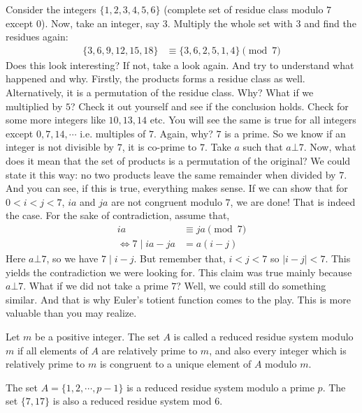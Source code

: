 Consider the integers $\{1,2,3,4,5,6\}$ (complete set of residue class modulo $7$ except $0$). Now, take an integer, say $3$. Multiply the whole set with $3$ and find the residues again:
	\begin{align*}
		\{3,6,9,12,15,18\} & \equiv\{3,6,2,5,1,4\}\pmod7
	\end{align*}
Does this look interesting? If not, take a look again. And try to understand what happened and why. Firstly, the products forms a residue class as well. Alternatively, it is a permutation of the residue class. Why? What if we multiplied by $5$? Check it out yourself and see if the conclusion holds. Check for some more integers like $10, 13,14$ etc. You will see the same is true for all integers except $0,7,14,\cdots$ i.e. multiples of $7$. Again, why? $7$ is a prime. So we know if an integer is not divisible by $7$, it is co-prime to $7$. Take $a$ such that $a\bot7$. Now, what does it mean that the set of products is a permutation of the original? We could state it this way: no two products leave the same remainder when divided by $7$. And you can see, if this is true, everything makes sense. If we can show that for $0<i<j<7$, $ia$ and $ja$ are not congruent modulo $7$, we are done! That is indeed the case. For the sake of contradiction, assume that,
	\begin{align*}
		ia
			& \equiv ja\pmod7\\
		\iff 7\mid ia-ja
			&=a(i-j)
	\end{align*}
Here $a\bot7$, so we have $7\mid i-j$. But remember that, $i<j<7$ so $|i-j|<7$. This yields the contradiction we were looking for. This claim was true mainly because $a\bot7$. What if we did not take a prime $7$? Well, we could still do something similar. And that is why Euler's totient function comes to the play. This is more valuable than you may realize.

\begin{definition}
	Let $m$ be a positive integer. The set $A$ is called a {reduced residue system modulo $m$} if all elements of $A$ are relatively prime to $m$, and also every integer which is relatively prime to $m$ is congruent to a unique element of $A$ modulo $m$.
\end{definition}

\begin{example}
	The set $A=\{ 1, 2, \cdots, p-1 \}$ is a reduced residue system modulo a prime $p$. The set $\{7, 17\}$ is also a reduced residue system mod $6$.
\end{example}

